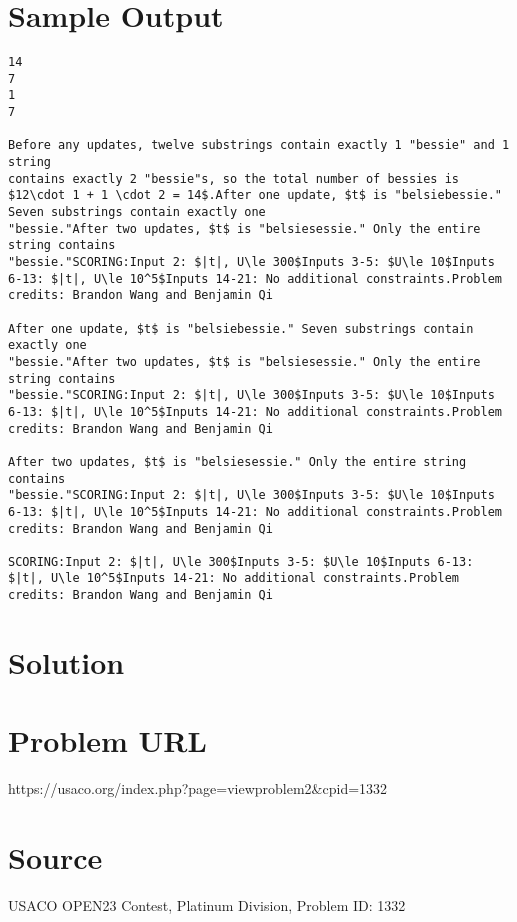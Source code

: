 \documentclass[12pt]{article}
\begin{document}
\section*{Sample Output}
\begin{verbatim}
14
7
1
7

Before any updates, twelve substrings contain exactly 1 "bessie" and 1 string
contains exactly 2 "bessie"s, so the total number of bessies is
$12\cdot 1 + 1 \cdot 2 = 14$.After one update, $t$ is "belsiebessie." Seven substrings contain exactly one
"bessie."After two updates, $t$ is "belsiesessie." Only the entire string contains
"bessie."SCORING:Input 2: $|t|, U\le 300$Inputs 3-5: $U\le 10$Inputs 6-13: $|t|, U\le 10^5$Inputs 14-21: No additional constraints.Problem credits: Brandon Wang and Benjamin Qi

After one update, $t$ is "belsiebessie." Seven substrings contain exactly one
"bessie."After two updates, $t$ is "belsiesessie." Only the entire string contains
"bessie."SCORING:Input 2: $|t|, U\le 300$Inputs 3-5: $U\le 10$Inputs 6-13: $|t|, U\le 10^5$Inputs 14-21: No additional constraints.Problem credits: Brandon Wang and Benjamin Qi

After two updates, $t$ is "belsiesessie." Only the entire string contains
"bessie."SCORING:Input 2: $|t|, U\le 300$Inputs 3-5: $U\le 10$Inputs 6-13: $|t|, U\le 10^5$Inputs 14-21: No additional constraints.Problem credits: Brandon Wang and Benjamin Qi

SCORING:Input 2: $|t|, U\le 300$Inputs 3-5: $U\le 10$Inputs 6-13: $|t|, U\le 10^5$Inputs 14-21: No additional constraints.Problem credits: Brandon Wang and Benjamin Qi
\end{verbatim}

\section*{Solution}


\section*{Problem URL}
https://usaco.org/index.php?page=viewproblem2&cpid=1332

\section*{Source}
USACO OPEN23 Contest, Platinum Division, Problem ID: 1332
\end{document}
